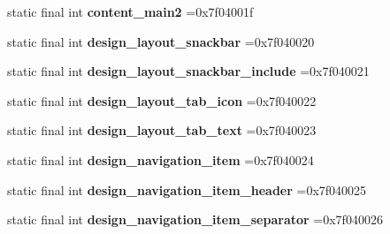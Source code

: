 \begin{DoxyCompactItemize}
\item 
\hypertarget{classcheck_1_1test_1_1_r_1_1layout_a7434aff5e01aebb5fa49fbfcb0ace097}{}static final int {\bfseries content\+\_\+main2} =0x7f04001f\label{classcheck_1_1test_1_1_r_1_1layout_a7434aff5e01aebb5fa49fbfcb0ace097}

\item 
\hypertarget{classcheck_1_1test_1_1_r_1_1layout_ac16096d23a0078227f092b1c1808567b}{}static final int {\bfseries design\+\_\+layout\+\_\+snackbar} =0x7f040020\label{classcheck_1_1test_1_1_r_1_1layout_ac16096d23a0078227f092b1c1808567b}

\item 
\hypertarget{classcheck_1_1test_1_1_r_1_1layout_a7a05fb8021d9aff9737b056ec1b4da27}{}static final int {\bfseries design\+\_\+layout\+\_\+snackbar\+\_\+include} =0x7f040021\label{classcheck_1_1test_1_1_r_1_1layout_a7a05fb8021d9aff9737b056ec1b4da27}

\item 
\hypertarget{classcheck_1_1test_1_1_r_1_1layout_a8b4eb6e8ed8cc4696426890aed9fd7c8}{}static final int {\bfseries design\+\_\+layout\+\_\+tab\+\_\+icon} =0x7f040022\label{classcheck_1_1test_1_1_r_1_1layout_a8b4eb6e8ed8cc4696426890aed9fd7c8}

\item 
\hypertarget{classcheck_1_1test_1_1_r_1_1layout_ad11e6ae357ff64af9d552a9afd274743}{}static final int {\bfseries design\+\_\+layout\+\_\+tab\+\_\+text} =0x7f040023\label{classcheck_1_1test_1_1_r_1_1layout_ad11e6ae357ff64af9d552a9afd274743}

\item 
\hypertarget{classcheck_1_1test_1_1_r_1_1layout_ac28002e55577f34056c50c24da1814ac}{}static final int {\bfseries design\+\_\+navigation\+\_\+item} =0x7f040024\label{classcheck_1_1test_1_1_r_1_1layout_ac28002e55577f34056c50c24da1814ac}

\item 
\hypertarget{classcheck_1_1test_1_1_r_1_1layout_a0cf8ff3dc3f4576c03077c1c8efb1ce3}{}static final int {\bfseries design\+\_\+navigation\+\_\+item\+\_\+header} =0x7f040025\label{classcheck_1_1test_1_1_r_1_1layout_a0cf8ff3dc3f4576c03077c1c8efb1ce3}

\item 
\hypertarget{classcheck_1_1test_1_1_r_1_1layout_aa77e03054476a59cdae34249adfd8219}{}static final int {\bfseries design\+\_\+navigation\+\_\+item\+\_\+separator} =0x7f040026\label{classcheck_1_1test_1_1_r_1_1layout_aa77e03054476a59cdae34249adfd8219}


\end{DoxyCompactItemize}
